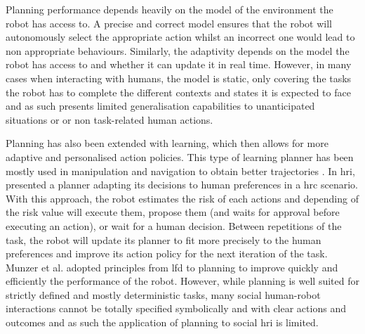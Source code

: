     Planning performance depends heavily on the model of the environment the robot has access to. A precise and correct model ensures that the robot will autonomously select the appropriate action whilst an incorrect one would lead to non appropriate behaviours. Similarly, the adaptivity depends on the model the robot has access to and whether it can update it in real time. However, in many cases when interacting with humans, the model is static, only covering the tasks the robot has to complete the different contexts and states it is expected to face and as such presents limited generalisation capabilities to unanticipated situations or or non task-related human actions.
    
    
    
    Planning has also been extended with learning, which then allows for more adaptive and personalised action policies. This type of learning planner has been mostly used in manipulation and navigation to obtain better trajectories \citep{jain2013learning,beetz2004rpllearn}. In \gls{hri}, \cite{munzer2017efficient} presented a planner adapting its decisions to human preferences in a \gls{hrc} scenario. With this approach, the robot estimates the risk of each actions and depending of the risk value will execute them, propose them (and waits for approval before executing an action), or wait for a human decision. Between repetitions of the task, the robot will update its planner to fit more precisely to the human preferences and improve its action policy for the next iteration of the task. Munzer et al. adopted principles from \gls{lfd} to planning to improve quickly and efficiently the performance of the robot. However, while planning is well suited for strictly defined and mostly deterministic tasks, many social human-robot interactions cannot be totally specified symbolically and with clear actions and outcomes and as such the application of planning to social \gls{hri} is limited.
	
